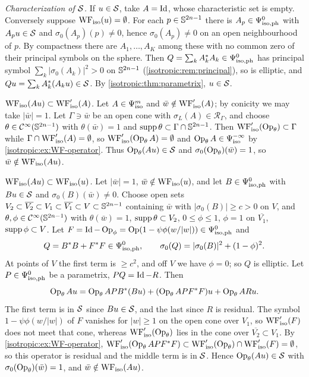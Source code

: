 \emph{Characterization of $\mathcal{S}$.} If $u\in\mathcal{S}$, take $A=\operatorname{Id}$, whose
characteristic set is empty. Conversely suppose $\operatorname{WF}_{\mathrm{iso}}(u)=\emptyset$. For each
$p\in\mathbb{S}^{2n-1}$ there is $A_p\in\Psi^{0}_{\mathrm{iso,ph}}$ with $A_pu\in\mathcal{S}$ and
$\sigma_0(A_p)(p)\ne0$, hence $\sigma_0(A_p)\ne0$ on an open neighbourhood of $p$.
By compactness there are $A_1,\dots,A_K$ among these with no common zero of
their principal symbols on the sphere. Then
$Q=\sum_kA_k^*A_k\in\Psi^{0}_{\mathrm{iso,ph}}$ has principal symbol
$\sum_k|\sigma_0(A_k)|^2>0$ on $\mathbb{S}^{2n-1}$ (\cref{isotropic:rem:principal}),
so is elliptic, and $Qu=\sum_kA_k^*(A_ku)\in\mathcal{S}$. By
\cref{isotropic:thm:parametrix}, $u\in\mathcal{S}$.

\emph{$\operatorname{WF}_{\mathrm{iso}}(Au)\subset\operatorname{WF}'_{\mathrm{iso}}(A)$.} Let $A\in\Psi^{m}_{\mathrm{iso}}$ and
$\bar w\notin\operatorname{WF}'_{\mathrm{iso}}(A)$; by conicity we may take $|\bar w|=1$. Let
$\Gamma\ni\bar w$ be an open cone with $\sigma_L(A)\in\mathcal R_\Gamma$, and choose
$\theta\in\mathcal{C}^\infty(\mathbb{S}^{2n-1})$ with $\theta(\bar w)=1$ and
$\operatorname{supp}\theta\subset\Gamma\cap\mathbb{S}^{2n-1}$. Then $\operatorname{WF}'_{\mathrm{iso}}(\operatorname{Op}_\theta)\subset\Gamma$
while $\Gamma\cap\operatorname{WF}'_{\mathrm{iso}}(A)=\emptyset$, so $\operatorname{WF}'_{\mathrm{iso}}(\operatorname{Op}_\theta A)=\emptyset$
and $\operatorname{Op}_\theta A\in\Psi^{-\infty}_{\mathrm{iso}}$ by \cref{isotropic:ex:WF-operator}. Thus
$\operatorname{Op}_\theta(Au)\in\mathcal{S}$ and $\sigma_0(\operatorname{Op}_\theta)(\bar w)=1$, so $\bar w\notin\operatorname{WF}_{\mathrm{iso}}(Au)$.

\emph{$\operatorname{WF}_{\mathrm{iso}}(Au)\subset\operatorname{WF}_{\mathrm{iso}}(u)$.} Let $|\bar w|=1$, $\bar w\notin\operatorname{WF}_{\mathrm{iso}}(u)$,
and let $B\in\Psi^{0}_{\mathrm{iso,ph}}$ with $Bu\in\mathcal{S}$ and $\sigma_0(B)(\bar w)\ne0$. Choose
open sets $V_2\subset\overline{V_2}\subset V_1\subset\overline{V_1}\subset V\subset\mathbb{S}^{2n-1}$
containing $\bar w$ with $|\sigma_0(B)|\ge c>0$ on $V$, and
$\theta,\phi\in\mathcal{C}^\infty(\mathbb{S}^{2n-1})$ with $\theta(\bar w)=1$, $\operatorname{supp}\theta\subset V_2$,
$0\le\phi\le1$, $\phi=1$ on $\overline{V_1}$, $\operatorname{supp}\phi\subset V$. Let
$F=\operatorname{Id}-\operatorname{Op}_\phi=\operatorname{Op}(1-\psi\phi(w/|w|))\in\Psi^{0}_{\mathrm{iso,ph}}$ and
\begin{equation*}
  Q=B^*B+F^*F\in\Psi^{0}_{\mathrm{iso,ph}},\qquad\sigma_0(Q)=|\sigma_0(B)|^2+(1-\phi)^2 .
\end{equation*}
At points of $V$ the first term is $\ge c^2$, and off $V$ we have $\phi=0$; so
$Q$ is elliptic. Let $P\in\Psi^{0}_{\mathrm{iso,ph}}$ be a parametrix, $PQ=\operatorname{Id}-R$. Then
\begin{equation*}
  \operatorname{Op}_\theta Au=\operatorname{Op}_\theta AP B^*(Bu)+(\operatorname{Op}_\theta APF^*F)u+\operatorname{Op}_\theta ARu .
\end{equation*}
The first term is in $\mathcal{S}$ since $Bu\in\mathcal{S}$, and the last since $R$ is
residual. The symbol $1-\psi\phi(w/|w|)$ of $F$ vanishes for $|w|\ge1$ on the
open cone over $V_1$, so $\operatorname{WF}'_{\mathrm{iso}}(F)$ does not meet that cone, whereas
$\operatorname{WF}'_{\mathrm{iso}}(\operatorname{Op}_\theta)$ lies in the cone over $\overline{V_2}\subset V_1$. By
\cref{isotropic:ex:WF-operator}, $\operatorname{WF}'_{\mathrm{iso}}(\operatorname{Op}_\theta APF^*F)\subset
\operatorname{WF}'_{\mathrm{iso}}(\operatorname{Op}_\theta)\cap\operatorname{WF}'_{\mathrm{iso}}(F)=\emptyset$, so this operator is
residual and the middle term is in $\mathcal{S}$. Hence $\operatorname{Op}_\theta(Au)\in\mathcal{S}$ with
$\sigma_0(\operatorname{Op}_\theta)(\bar w)=1$, and $\bar w\notin\operatorname{WF}_{\mathrm{iso}}(Au)$.

